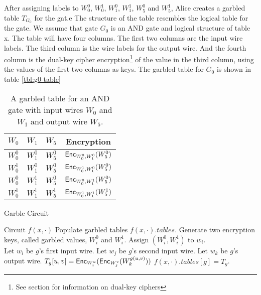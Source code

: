 After assigning labels to $W_0^0$, $W_0^1$, $W_1^0$, $W_1^1$, $W_5^0$ and $W_5^1$, Alice creates a garbled table $T_{G_0}$ for the gat.e
The structure of the table resembles the logical table for the gate.
We assume that gate $G_0$ is an AND gate and logical structure of table x.
The table will have four columns. 
The first two columns are the input wire labels.
The third column is the wire labels for the output wire.
And the fourth column is the dual-key cipher encryption\footnote{See section  for information on dual-key ciphers} of the value in the third column, using the values of the first two columns as keys.
The garbled table for $G_0$ is shown in table \ref{tbl:g0-table}

\begin{table}[h]
\centering
\begin{tabular}{|c|c|c|c|}
\hline
$W_0$ & $W_1$ & $W_5$ & Encryption \\
\hline
$W_0^0$ & $W_1^0$ & $W_5^0$ & $\textsf{Enc}_{W_0^0, W_1^0}(W_5^0)$ \\
$W_0^1$ & $W_1^0$ & $W_5^0$ & $\textsf{Enc}_{W_0^1, W_1^0}(W_5^0)$ \\
$W_0^0$ & $W_1^1$ & $W_5^0$ & $\textsf{Enc}_{W_0^0, W_1^1}(W_5^0)$ \\
$W_0^1$ & $W_1^1$ & $W_5^1$ & $\textsf{Enc}_{W_0^1, W_1^1}(W_5^1)$ \\
\hline
\end{tabular}
\caption{A garbled table for an AND gate with input wires $W_0$ and $W_1$ and output wire $W_5$.}
\end{table}



\begin{algorithm}
\caption{Garble Circuit}
\label{alg:garble}
\begin{algorithmic}
    \Require Circuit $f(x,\cdot)$ 
    \Ensure Populate garbled tables $f(x,\cdot).tables$.
    \State Generate two encryption keys, called garbled values, $W_i^0$ and $W_i^1$.
    \State Assign $(W_i^0, W_i^1)$ to $w_i$.
\EndFor \\

    \State Let $w_i$ be $g$'s first input wire.
    \State Let $w_j$ be $g$'s second input wire.
    \State Let $w_k$ be $g$'s output wire.
    \State $T_g[u,v] = \textsf{Enc}_{W_i^u}( \textsf{Enc}_{W_j^v} ( W_k^{g(u,v)}))$
    \EndFor
    \State $f(x,\cdot).tables[g] = T_g$.
\EndFor
\end{algorithmic}
\end{algorithm}

